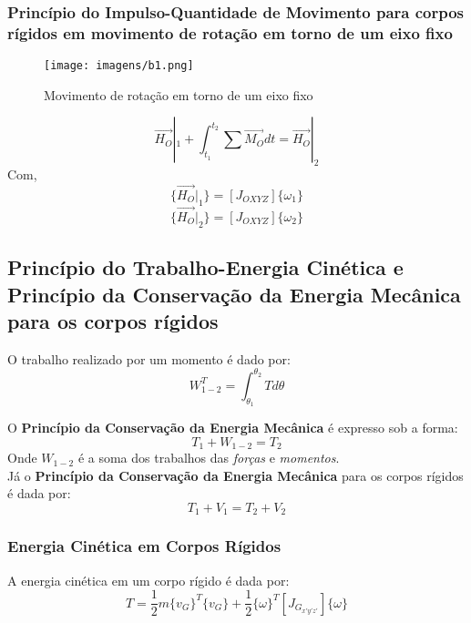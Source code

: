 \documentclass[a4paper, 12pt]{article}
\begin{document}
		\newpage
		\subsubsection{Princípio do Impulso-Quantidade de Movimento para corpos rígidos em movimento de rotação em torno de um eixo fixo}
		\begin{figure}[h]
			\center
			\texttt{[image: imagens/b1.png]} 
			\caption{Movimento de rotação em torno de um eixo fixo}
		\end{figure}
		\begin{equation}
			\vec{H_O}|_1 + \int^{t_2}_{t_1} \sum \vec{M_O} dt = \vec{H_O}|_2
		\end{equation}	
		Com,
		\begin{equation}
			\{\vec{H_O}|_1\} = [J_{OXYZ}]\{\omega_1\}
		\end{equation}
		\begin{equation}
			\{\vec{H_O}|_2\} = [J_{OXYZ}]\{\omega_2\}
		\end{equation}

		
	\subsection{Princípio do Trabalho-Energia Cinética e Princípio da Conservação da Energia Mecânica para os corpos rígidos}
	O trabalho realizado por um momento é dado por:
	\begin{equation}
		W_{1-2}^T = \int^{\theta_2}_{\theta_1} T d\theta
	\end{equation}

	O \textbf{Princípio da Conservação da Energia Mecânica} é expresso sob a forma:
	\begin{equation}
		T_1 + W_{1-2} = T_2
	\end{equation}
	Onde $W_{1-2}$ é a soma dos trabalhos das \textit{forças} e \textit{momentos}.\\
	
	Já o \textbf{Princípio da Conservação da Energia Mecânica} para os corpos rígidos é dada por:
	\begin{equation}
		T_1 + V_1 = T_2 + V_2
	\end{equation}

	\subsubsection{Energia Cinética em Corpos Rígidos}
	A energia cinética em um corpo rígido é dada por:
	\begin{equation}
		T = \frac{1}{2}	m\{v_G\}^T\{v_G\} + \frac{1}{2}\{\omega \}^T[J_{G_{x'y'z'}}]\{\omega \}
	\end{equation}
\end{document}
